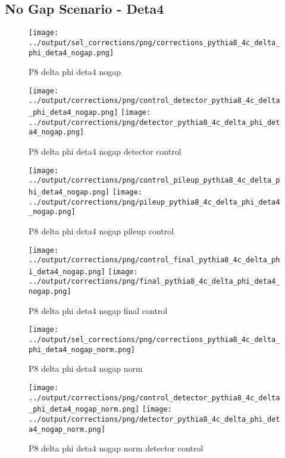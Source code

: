 \documentclass[11pt]{book}
\begin{document}
\clearpage
\subsection{No Gap Scenario - Deta4}
\begin{figure}[ht]
\centering
\texttt{[image: ../output/sel\_corrections/png/corrections\_pythia8\_4c\_delta\_phi\_deta4\_nogap.png]}
\caption{P8 delta phi deta4 nogap}
\label{fig:p8_delta_phi_deta4_nogap}
\end{figure}

\begin{figure}[ht]
\centering
\texttt{[image: ../output/corrections/png/control\_detector\_pythia8\_4c\_delta\_phi\_deta4\_nogap.png]}
\texttt{[image: ../output/corrections/png/detector\_pythia8\_4c\_delta\_phi\_deta4\_nogap.png]}
\caption{P8 delta phi deta4 nogap detector control}
\label{fig:p8_delta_phi_deta4_nogap_detector_control}
\end{figure}

\begin{figure}[ht]
\centering
\texttt{[image: ../output/corrections/png/control\_pileup\_pythia8\_4c\_delta\_phi\_deta4\_nogap.png]}
\texttt{[image: ../output/corrections/png/pileup\_pythia8\_4c\_delta\_phi\_deta4\_nogap.png]}
\caption{P8 delta phi deta4 nogap pileup control}
\label{fig:p8_delta_phi_deta4_nogap_pileup_control}
\end{figure}


\begin{figure}[ht]
\centering
\texttt{[image: ../output/corrections/png/control\_final\_pythia8\_4c\_delta\_phi\_deta4\_nogap.png]}
\texttt{[image: ../output/corrections/png/final\_pythia8\_4c\_delta\_phi\_deta4\_nogap.png]}
\caption{P8 delta phi deta4 nogap final control}
\label{fig:p8_delta_phi_deta4_nogap_final_control}
\end{figure}


\begin{figure}[ht]
\centering
\texttt{[image: ../output/sel\_corrections/png/corrections\_pythia8\_4c\_delta\_phi\_deta4\_nogap\_norm.png]}
\caption{P8 delta phi deta4 nogap norm}
\label{fig:p8_delta_phi_deta4_nogap_norm}
\end{figure}

\begin{figure}[ht]
\centering
\texttt{[image: ../output/corrections/png/control\_detector\_pythia8\_4c\_delta\_phi\_deta4\_nogap\_norm.png]}
\texttt{[image: ../output/corrections/png/detector\_pythia8\_4c\_delta\_phi\_deta4\_nogap\_norm.png]}
\caption{P8 delta phi deta4 nogap norm detector control}
\label{fig:p8_delta_phi_deta4_nogap_norm_detector_control}
\end{figure}
\end{document}

